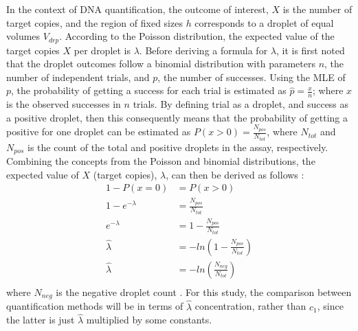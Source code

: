 In the context of DNA quantification, the outcome of interest, \(X\) is the number of target copies, and the region of fixed sizes \(h\) corresponds to a droplet of equal volumes \(V_{drp}\). According to the Poisson distribution, the expected value of the target copies \(X\) per droplet is \(\lambda\). Before deriving a formula for \(\lambda\), it is first noted that the droplet outcomes follow a binomial distribution with parameters \(n\), the number of independent trials, and \(p\), the number of successes. Using the MLE of \(p\), the probability of getting a success for each trial is estimated as \(\hat{p}=\frac{x}{n}\); where \(x\) is the observed successes in \(n\) trials. By defining trial as a droplet, and success as a positive droplet, then this consequently means that the probability of getting a positive for one droplet can be estimated as \(P(x>0) = \frac{N_{pos}}{N_{tot}}\), where \(N_{tot}\) and \(N_{pos}\) is the count of the total and positive droplets in the assay, respectively. Combining the concepts from the Poisson and binomial distributions, the expected value of \(X\) (target copies), \(\lambda\), can then be derived as follows :
\[
    \begin{aligned}
        1-P(x=0) &= P(x>0)\\
        1-e^{-\lambda} &= \frac{N_{pos}}{N_{tot}}\\
        e^{-\lambda} &= 1-\frac{N_{pos}}{N_{tot}}\\
        \hat{\lambda} &= -ln(1-\frac{N_{pos}}{N_{tot}})\\
        \hat{\lambda} &= -ln(\frac{N_{neg}}{N_{tot}})\\
    \end{aligned}
\]
where \(N_{neg}\) is the negative droplet count \cite{Tzonev2018}. For this study, the comparison between quantification methods will be in terms of \(\hat{\lambda}\) concentration, rather than \(c_{1}\),  since the latter is just \(\hat{\lambda}\) multiplied by some constants.


